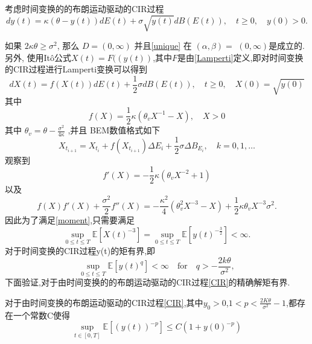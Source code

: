 	\begin{example}
		考虑时间变换的的布朗运动驱动的CIR过程
		\begin{equation}\label{CIR}
			dy(t)=\kappa(\theta-y(t))dE(t)+\sigma\sqrt{y(t)}dB(E(t)),\quad t\geq0,\quad y(0)>0.
		\end{equation}
	\end{example}
	如果 $2\kappa\theta\geq\sigma^{2}$, 那么 $D=(0,\infty)$ 并且\cref{unique} 在 $(\alpha,\beta)=$
	$(0,\infty)$是成立的. 
	另外, 使用It\^{o}公式$X(t)=F((y(t))$,其中$F$是由\cref{Lamperti}定义,即对时间变换的CIR过程进行Lamperti变换可以得到
	\begin{equation}
		dX(t)=f(X(t))dE(t)+\frac12\sigma dB(E(t)),\quad t\geq0,\quad X(0)=\sqrt{y(0)}
	\end{equation}
	其中
	\begin{equation}
		f(X)=\dfrac{1}{2}\kappa\left(\theta_vX^{-1}-X\right),\quad X>0
	\end{equation}
	其中 $\theta_v=\theta-\frac{\sigma^2}{4\kappa}$ ,并且 BEM数值格式如下
	\begin{equation}
		X_{t_{i+1}}=X_{t_{i}}+f(X_{t_{i+1}})\Delta E_i+\frac{1}{2}\sigma\Delta B_{E_i},\quad k=0,1,\dots 
	\end{equation}
	观察到
	\begin{equation}
		f'(X)=-\frac{1}{2}\kappa(\theta_vX^{-2}+1)
	\end{equation}
	以及
	\begin{equation}
		f(X)f'(X)+\frac{\sigma^2}{2}f''(X)=-\frac{\kappa^2}{4}(\theta_v^2X^{-3}-X)+\frac{1}{2}\kappa\theta_vX^{-3}\sigma^2.
	\end{equation}
	因此为了满足\cref{moment},只需要满足
	\begin{equation}
		\sup_{0\leq t\leq T}\mathbb{E}[X(t)^{-3}]=\sup_{0\leq t\leq T}\mathbb{E}[y(t)^{-\frac{3}{2}}] < \infty.
	\end{equation}
	对于时间变换的CIR过程y(t)的矩有界,即
	\begin{equation}
		\sup\limits_{0\leq t\leq T}\mathbb{E}[y(t)^q]<\infty\quad\mathrm{for}\quad q>-\frac{2k\theta}{\sigma^2},
	\end{equation}
	下面验证,对于由时间变换的的布朗运动驱动的CIR过程\cref{CIR}的精确解矩有界.
	\begin{proposition}
		对于由时间变换的布朗运动驱动的CIR过程\cref{CIR},其中$y_0>0$,$1<p<\frac{2K\theta}{\sigma^2}-1$,都存在一个常数C使得
		\begin{equation*}
			\sup\limits_{t\in[0,T]}\mathbb{E}\left[\left(y(t)\right)^{-p}\right]\leq C(1+y(0)^{-p})
		\end{equation*}
	\end{proposition}
